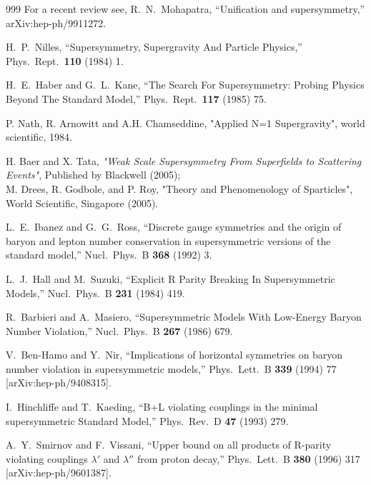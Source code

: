 \begin{thebibliography}{999}
For a recent review see, 
  R.~N.~Mohapatra,
  ``Unification and supersymmetry,''
  arXiv:hep-ph/9911272.

  H.~P.~Nilles,
  ``Supersymmetry, Supergravity And Particle Physics,''
  Phys.\ Rept.\  {\bf 110} (1984) 1.

  H.~E.~Haber and G.~L.~Kane,
  ``The Search For Supersymmetry: Probing Physics Beyond The Standard Model,''
  Phys.\ Rept.\  {\bf 117} (1985) 75.

P. Nath, R. Arnowitt
and A.H. Chamseddine, "Applied N=1 Supergravity", world scientific,
1984.

H. Baer and X. Tata, 
{\it "Weak Scale Supersymmetry 
From Superfields to Scattering Events"},
Published by Blackwell (2005);\\
M. Drees, R. Godbole, and P. Roy, 
"Theory and Phenomenology of Sparticles",
World Scientific, Singapore (2005).

  L.~E.~Ibanez and G.~G.~Ross,
  ``Discrete gauge symmetries and the origin of baryon and lepton number
  conservation in supersymmetric versions of the standard model,''
  Nucl.\ Phys.\ B {\bf 368} (1992) 3.

  L.~J.~Hall and M.~Suzuki,
  ``Explicit R Parity Breaking In Supersymmetric Models,''
  Nucl.\ Phys.\ B {\bf 231} (1984) 419.

  R.~Barbieri and A.~Masiero,
  ``Supersymmetric Models With Low-Energy Baryon Number Violation,''
  Nucl.\ Phys.\ B {\bf 267} (1986) 679.

  V.~Ben-Hamo and Y.~Nir,
  ``Implications of horizontal symmetries on baryon number violation in
  supersymmetric models,''
  Phys.\ Lett.\ B {\bf 339} (1994) 77
  [arXiv:hep-ph/9408315].

  I.~Hinchliffe and T.~Kaeding,
  ``B+L violating couplings in the minimal supersymmetric Standard Model,''
  Phys.\ Rev.\ D {\bf 47} (1993) 279.

  A.~Y.~Smirnov and F.~Vissani,
  ``Upper bound on all products of R-parity violating couplings $\lambda'$ and
  $\lambda''$ from proton decay,''
  Phys.\ Lett.\ B {\bf 380} (1996) 317
  [arXiv:hep-ph/9601387].


\end{thebibliography}
